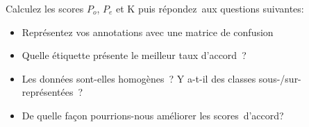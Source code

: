 Calculez les scores $P_o$, $P_e$ et K puis répondez aux questions suivantes:
\begin{itemize}
  \item Représentez vos annotations avec une matrice de confusion
  \item Quelle étiquette présente le meilleur taux d'accord ?
  \item Les données sont-elles homogènes ? Y a-t-il des classes sous-/sur-représentées ?
  \item De quelle façon pourrions-nous améliorer les scores d'accord?
\end{itemize}



\noindent{}
